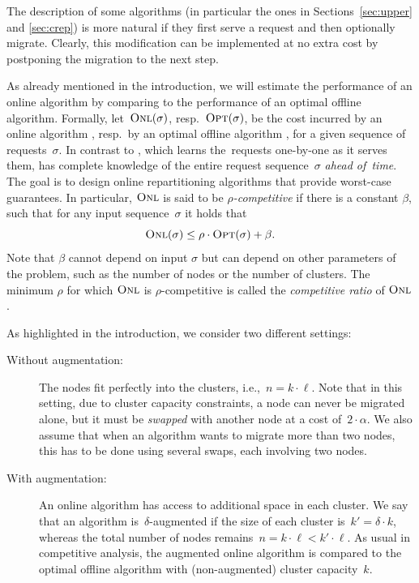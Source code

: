 The description of some algorithms (in particular the ones in Sections~\ref{sec:upper}
and \ref{sec:crep}) is more natural if they first serve a request and then
optionally migrate. Clearly, this modification can be implemented at no extra cost by
postponing the migration to the next step.

As already mentioned in the introduction, we will estimate
the performance of an online algorithm by comparing to the performance of an optimal offline
algorithm. Formally, let~$\textsc{Onl}(\sigma)$, resp.~$\textsc{Opt}(\sigma)$, be the cost
incurred by an online algorithm \ONL, resp.~by an optimal offline
algorithm \OPT, for a given sequence of requests~$\sigma$. In contrast to \ONL, which learns the~requests one-by-one as
it serves them, \OPT has complete knowledge of the entire request
sequence~$\sigma$ \emph{ahead of~time}. The goal is to design online repartitioning
algorithms that provide worst-case guarantees. In particular, $\textsc{Onl}$ is said
to be \emph{$\rho$-competitive} if there is a constant $\beta$, such that for any
input sequence~$\sigma$ it holds that
\[
	\textsc{Onl}(\sigma) \leq \rho \cdot \textsc{Opt}(\sigma) + \beta.
\]
Note that $\beta$ cannot depend on input $\sigma$ but can depend on other
parameters of the problem, such as the number of nodes or the number of clusters.
The minimum $\rho$ for which $\textsc{Onl}$ is $\rho$-competitive is called the 
\emph{competitive ratio} of $\textsc{Onl}$. 

As highlighted in the introduction, we consider two different settings:

\begin{description}

\item[Without augmentation:] The nodes fit perfectly into the clusters,
i.e.,~$n=k\cdot \ell$. Note that in this setting, due to cluster capacity
constraints, a node can never be migrated alone, but it must be \emph{swapped}
with another node at a cost of~$2 \cdot \alpha$. We also assume that when an
algorithm wants to migrate more than two nodes, this has to be done using
several swaps, each involving two nodes.

\item[With augmentation:] An online algorithm has access to additional space
in each cluster. We say that an algorithm is~$\delta$-augmented if the size of
each cluster is~$k' = \delta \cdot k$, whereas the total number of nodes
remains~$n = k\cdot \ell < k'\cdot \ell$. As usual in competitive analysis,
the augmented online algorithm is compared to the optimal offline algorithm
with (non-augmented) cluster capacity~$k$.
\end{description}

